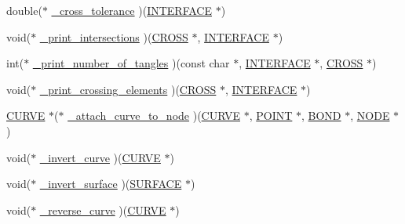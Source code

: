 \begin{DoxyCompactItemize}
\item 
double($\ast$ \hyperlink{struct___i___u_s_e_r___i_n_t_e_r_f_a_c_e_a87723130509a1bb3fd66e074f76d9d9a}{\+\_\+cross\+\_\+tolerance} )(\hyperlink{int_8h_a58cf562d0d320a608294b7310ea167dc}{I\+N\+T\+E\+R\+F\+A\+CE} $\ast$)
\item 
void($\ast$ \hyperlink{struct___i___u_s_e_r___i_n_t_e_r_f_a_c_e_a4329d57c0c368ce6a2a971df6d400594}{\+\_\+print\+\_\+intersections} )(\hyperlink{int_8h_ade0b8470b483dfba2e7378f5dad9eebd}{C\+R\+O\+SS} $\ast$, \hyperlink{int_8h_a58cf562d0d320a608294b7310ea167dc}{I\+N\+T\+E\+R\+F\+A\+CE} $\ast$)
\item 
int($\ast$ \hyperlink{struct___i___u_s_e_r___i_n_t_e_r_f_a_c_e_a71853cc35225cada6737ac43b2325eb8}{\+\_\+print\+\_\+number\+\_\+of\+\_\+tangles} )(const char $\ast$, \hyperlink{int_8h_a58cf562d0d320a608294b7310ea167dc}{I\+N\+T\+E\+R\+F\+A\+CE} $\ast$, \hyperlink{int_8h_ade0b8470b483dfba2e7378f5dad9eebd}{C\+R\+O\+SS} $\ast$)
\item 
void($\ast$ \hyperlink{struct___i___u_s_e_r___i_n_t_e_r_f_a_c_e_a369ea3051c5e75d5daa813b5824834dc}{\+\_\+print\+\_\+crossing\+\_\+elements} )(\hyperlink{int_8h_ade0b8470b483dfba2e7378f5dad9eebd}{C\+R\+O\+SS} $\ast$, \hyperlink{int_8h_a58cf562d0d320a608294b7310ea167dc}{I\+N\+T\+E\+R\+F\+A\+CE} $\ast$)
\item 
\hyperlink{int_8h_a4c1c272bef898dbaa20b055af85cd685}{C\+U\+R\+VE} $\ast$($\ast$ \hyperlink{struct___i___u_s_e_r___i_n_t_e_r_f_a_c_e_a9e617ec3565a61624211ae909d366f0c}{\+\_\+attach\+\_\+curve\+\_\+to\+\_\+node} )(\hyperlink{int_8h_a4c1c272bef898dbaa20b055af85cd685}{C\+U\+R\+VE} $\ast$, \hyperlink{int_8h_a3a87c5c9d0146e30a4bf720f701e5a63}{P\+O\+I\+NT} $\ast$, \hyperlink{int_8h_a13b5a9ccac0e6d04386af2ef62582540}{B\+O\+ND} $\ast$, \hyperlink{int_8h_a65acc517559b106aa8e5fe339247ddcd}{N\+O\+DE} $\ast$)
\item 
void($\ast$ \hyperlink{struct___i___u_s_e_r___i_n_t_e_r_f_a_c_e_a04dd290edac5d0a40a63957a4dcb9c73}{\+\_\+invert\+\_\+curve} )(\hyperlink{int_8h_a4c1c272bef898dbaa20b055af85cd685}{C\+U\+R\+VE} $\ast$)
\item 
void($\ast$ \hyperlink{struct___i___u_s_e_r___i_n_t_e_r_f_a_c_e_a4547066ccd7ce47db7beff11d45b70ff}{\+\_\+invert\+\_\+surface} )(\hyperlink{int_8h_a1520d8870b5eafd76bd401aecb121ffd}{S\+U\+R\+F\+A\+CE} $\ast$)
\item 
void($\ast$ \hyperlink{struct___i___u_s_e_r___i_n_t_e_r_f_a_c_e_aa86ed303de75bfd2e871a76989a5a3be}{\+\_\+reverse\+\_\+curve} )(\hyperlink{int_8h_a4c1c272bef898dbaa20b055af85cd685}{C\+U\+R\+VE} $\ast$)

\end{DoxyCompactItemize}
